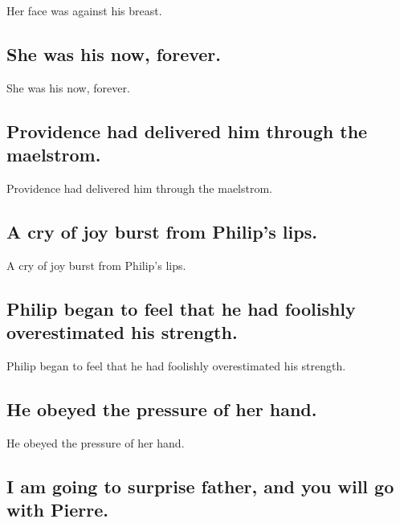 \documentclass[]{article}
\begin{document}
Her face was against his breast.

\hypertarget{she-was-his-now-forever.}{%
\subsection{She was his now, forever.}\label{she-was-his-now-forever.}}

She was his now, forever.

\hypertarget{providence-had-delivered-him-through-the-maelstrom.}{%
\subsection{Providence had delivered him through the
maelstrom.}\label{providence-had-delivered-him-through-the-maelstrom.}}

Providence had delivered him through the maelstrom.

\hypertarget{a-cry-of-joy-burst-from-philips-lips.}{%
\subsection{A cry of joy burst from Philip's
lips.}\label{a-cry-of-joy-burst-from-philips-lips.}}

A cry of joy burst from Philip's lips.

\hypertarget{philip-began-to-feel-that-he-had-foolishly-overestimated-his-strength.}{%
\subsection{Philip began to feel that he had foolishly overestimated his
strength.}\label{philip-began-to-feel-that-he-had-foolishly-overestimated-his-strength.}}

Philip began to feel that he had foolishly overestimated his strength.

\hypertarget{he-obeyed-the-pressure-of-her-hand.}{%
\subsection{He obeyed the pressure of her
hand.}\label{he-obeyed-the-pressure-of-her-hand.}}

He obeyed the pressure of her hand.

\hypertarget{i-am-going-to-surprise-father-and-you-will-go-with-pierre.}{%
\subsection{I am going to surprise father, and you will go with
Pierre.}\label{i-am-going-to-surprise-father-and-you-will-go-with-pierre.}}
\end{document}
